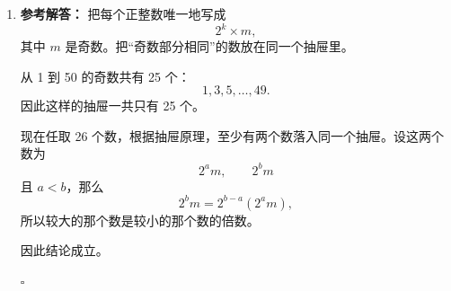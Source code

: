 \documentclass[11pt,a4paper,fontset=fandol]{ctexart}
\newenvironment{solution}{\par\noindent\textbf{参考解答：}}{\hfill$\square$\par}
\begin{document}
\begin{enumerate}
\begin{solution}
  但若跳 7 步，因为 7 是奇数，颜色会改变奇数次，最后应落在与起点异色的格点上，这与终点同色矛盾。

  所以不可能恰好跳 7 步到达 $(4,4)$。

  \end{solution}

  \item \begin{solution}
  把每个正整数唯一地写成
  \[
  2^k\times m,
  \]
  其中 $m$ 是奇数。把“奇数部分相同”的数放在同一个抽屉里。

  从 1 到 50 的奇数共有 25 个：
  \[
  1,3,5,\ldots,49.
  \]
  因此这样的抽屉一共只有 25 个。

  现在任取 26 个数，根据抽屉原理，至少有两个数落入同一个抽屉。设这两个数为
  \[
  2^a m,\qquad 2^b m
  \]
  且 $a<b$，那么
  \[
  2^b m=2^{b-a}(2^a m),
  \]
  所以较大的那个数是较小的那个数的倍数。

  因此结论成立。

  \end{solution}
\end{enumerate}
\end{document}
